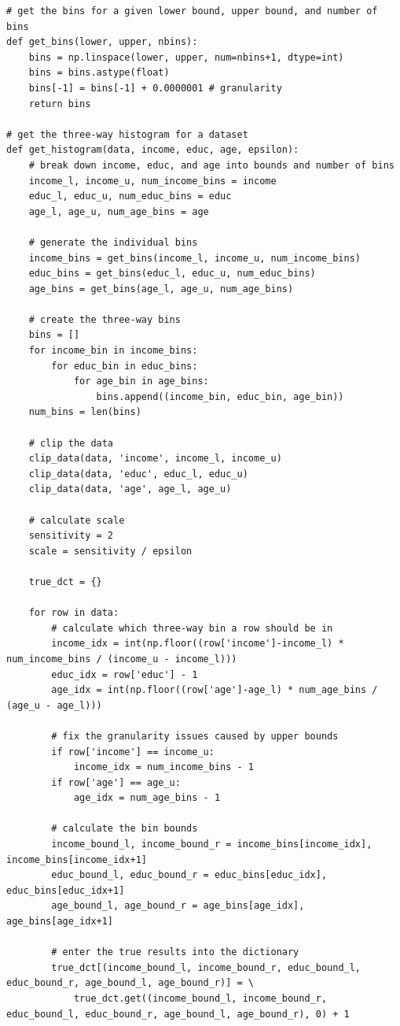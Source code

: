 \documentclass[12pt]{article}
\begin{document}
\begin{appendices}
\begin{lstlisting}
# get the bins for a given lower bound, upper bound, and number of bins
def get_bins(lower, upper, nbins):
    bins = np.linspace(lower, upper, num=nbins+1, dtype=int)
    bins = bins.astype(float)
    bins[-1] = bins[-1] + 0.0000001 # granularity
    return bins

# get the three-way histogram for a dataset
def get_histogram(data, income, educ, age, epsilon):
    # break down income, educ, and age into bounds and number of bins
    income_l, income_u, num_income_bins = income
    educ_l, educ_u, num_educ_bins = educ
    age_l, age_u, num_age_bins = age

    # generate the individual bins
    income_bins = get_bins(income_l, income_u, num_income_bins)
    educ_bins = get_bins(educ_l, educ_u, num_educ_bins)
    age_bins = get_bins(age_l, age_u, num_age_bins)

    # create the three-way bins
    bins = []
    for income_bin in income_bins:
        for educ_bin in educ_bins:
            for age_bin in age_bins:
                bins.append((income_bin, educ_bin, age_bin))
    num_bins = len(bins)

    # clip the data
    clip_data(data, 'income', income_l, income_u)
    clip_data(data, 'educ', educ_l, educ_u)
    clip_data(data, 'age', age_l, age_u)

    # calculate scale
    sensitivity = 2
    scale = sensitivity / epsilon

    true_dct = {}

    for row in data:
        # calculate which three-way bin a row should be in
        income_idx = int(np.floor((row['income']-income_l) * num_income_bins / (income_u - income_l)))
        educ_idx = row['educ'] - 1
        age_idx = int(np.floor((row['age']-age_l) * num_age_bins / (age_u - age_l)))

        # fix the granularity issues caused by upper bounds
        if row['income'] == income_u:
            income_idx = num_income_bins - 1
        if row['age'] == age_u:
            age_idx = num_age_bins - 1

        # calculate the bin bounds
        income_bound_l, income_bound_r = income_bins[income_idx], income_bins[income_idx+1]
        educ_bound_l, educ_bound_r = educ_bins[educ_idx], educ_bins[educ_idx+1]
        age_bound_l, age_bound_r = age_bins[age_idx], age_bins[age_idx+1]

        # enter the true results into the dictionary
        true_dct[(income_bound_l, income_bound_r, educ_bound_l, educ_bound_r, age_bound_l, age_bound_r)] = \
            true_dct.get((income_bound_l, income_bound_r, educ_bound_l, educ_bound_r, age_bound_l, age_bound_r), 0) + 1


\end{lstlisting}
\end{appendices}
\end{document}
